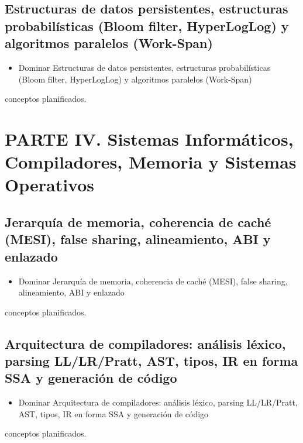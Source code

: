 \documentclass{book}
\begin{document}
\subsection*{\checkmark Estructuras de datos persistentes, estructuras probabilísticas (Bloom filter, HyperLogLog) y algoritmos paralelos (Work-Span)}
\begin{itemize}
\item Dominar Estructuras de datos persistentes, estructuras probabilísticas (Bloom filter, HyperLogLog) y algoritmos paralelos (Work-Span)
\end{itemize}
 conceptos planificados.

\section*{PARTE IV. Sistemas Informáticos, Compiladores, Memoria y Sistemas Operativos}

\subsection*{\checkmark Jerarquía de memoria, coherencia de caché (MESI), false sharing, alineamiento, ABI y enlazado}
\begin{itemize}
\item Dominar Jerarquía de memoria, coherencia de caché (MESI), false sharing, alineamiento, ABI y enlazado
\end{itemize}
 conceptos planificados.

\subsection*{\checkmark Arquitectura de compiladores: análisis léxico, parsing LL/LR/Pratt, AST, tipos, IR en forma SSA y generación de código}
\begin{itemize}
\item Dominar Arquitectura de compiladores: análisis léxico, parsing LL/LR/Pratt, AST, tipos, IR en forma SSA y generación de código
\end{itemize}
 conceptos planificados.
\end{document}
